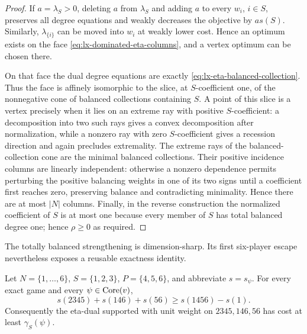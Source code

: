 \begin{proof}
If $a=\lambda_S>0$, deleting $a$ from $\lambda_S$ and adding $a$ to every
$w_i$, $i\in S$, preserves all degree equations and weakly decreases the
objective by $a s(S)$.  Similarly, $\lambda_{\{i\}}$ can be moved into
$w_i$ at weakly lower cost.  Hence an optimum exists on the face
\eqref{eq:lx-dominated-eta-columns}, and a vertex optimum can be chosen there.

On that face the dual degree equations are exactly
\eqref{eq:lx-eta-balanced-collection}.  Thus the face is affinely isomorphic
to the slice, at $S$-coefficient one, of the nonnegative cone of balanced
collections containing $S$.  A point of this slice is a vertex precisely when
it lies on an extreme ray with positive $S$-coefficient: a decomposition into
two such rays gives a convex decomposition after normalization, while a
nonzero ray with zero $S$-coefficient gives a recession direction and again
precludes extremality.  The extreme rays of the balanced-collection cone are
the minimal balanced collections.  Their positive incidence columns are
linearly independent: otherwise a nonzero dependence permits perturbing the
positive balancing weights in one of its two signs until a coefficient first
reaches zero, preserving balance and contradicting minimality.  Hence there
are at most $|N|$ columns.  Finally, in the
reverse construction the normalized coefficient of $S$ is at most one
because every member of $S$ has total balanced degree one; hence
$\rho\geq0$ as required.
\end{proof}

The totally balanced strengthening is dimension-sharp.  Its first
six-player escape nevertheless exposes a reusable exactness identity.

\begin{lemma}
\label{lem:lx-three-block-exact-closure}
Let $N=\{1,\ldots,6\}$, $S=\{1,2,3\}$, $P=\{4,5,6\}$, and abbreviate
$s=s_\psi$.  For every exact game and every $\psi\in\operatorname{Core}(v)$,
\[
 s(2345)+s(146)+s(56)\geq s(1456)-s(1).
 \tag{TB}\label{eq:lx-three-block-exact-closure}
\]
Consequently the eta-dual supported with unit weight on
$2345,146,56$ has cost at least $\gamma_S(\psi)$.
\end{lemma}

